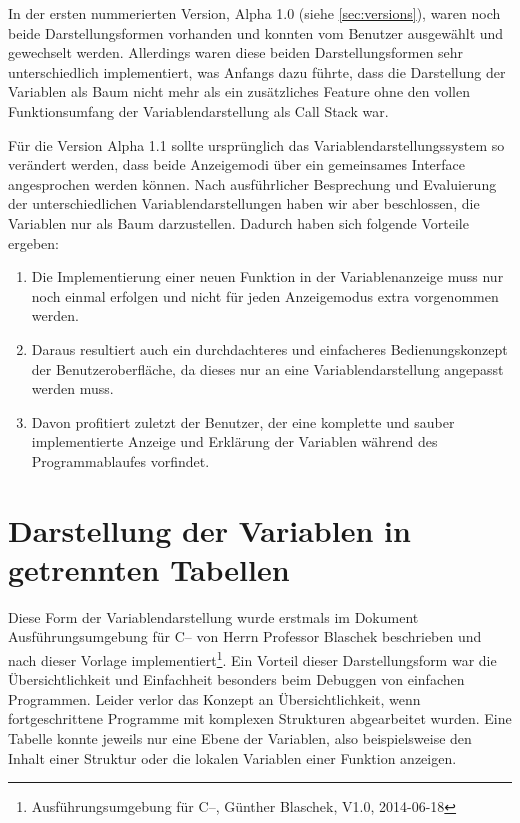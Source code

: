 In der ersten nummerierten Version, Alpha 1.0 (siehe \ref{sec:versions}), waren noch beide Darstellungsformen vorhanden und konnten vom Benutzer ausgewählt und gewechselt werden. Allerdings waren diese beiden Darstellungsformen sehr unterschiedlich implementiert, was Anfangs dazu führte, dass die Darstellung der Variablen als Baum nicht mehr als ein zusätzliches Feature ohne den vollen Funktionsumfang der Variablendarstellung als Call Stack war.

Für die Version Alpha 1.1 sollte ursprünglich das Variablendarstellungssystem so verändert werden, dass beide Anzeigemodi über ein gemeinsames Interface angesprochen werden können. Nach ausführlicher Besprechung und Evaluierung der unterschiedlichen Variablendarstellungen haben wir aber beschlossen, die Variablen nur als Baum darzustellen. Dadurch haben sich folgende Vorteile ergeben:
\begin{enumerate}
\item Die Implementierung einer neuen Funktion in der Variablenanzeige muss nur noch einmal erfolgen und nicht für jeden Anzeigemodus extra vorgenommen werden.
\item Daraus resultiert auch ein durchdachteres und einfacheres Bedienungskonzept der Benutzeroberfläche, da dieses nur an eine Variablendarstellung angepasst werden muss.
\item Davon profitiert zuletzt der Benutzer, der eine komplette und sauber implementierte Anzeige und Erklärung der Variablen während des Programmablaufes vorfindet.
\end{enumerate}

\section{Darstellung der Variablen in getrennten Tabellen}

Diese Form der Variablendarstellung wurde erstmals im Dokument Ausführungsumgebung für C-- von Herrn Professor Blaschek beschrieben und nach dieser Vorlage implementiert\footnote{Ausführungsumgebung für C--, Günther Blaschek, V1.0, 2014-06-18}. Ein Vorteil dieser Darstellungsform war die Übersichtlichkeit und Einfachheit besonders beim Debuggen von einfachen Programmen. Leider verlor das Konzept an Übersichtlichkeit, wenn fortgeschrittene Programme mit komplexen Strukturen abgearbeitet wurden. Eine Tabelle konnte jeweils nur eine Ebene der Variablen, also beispielsweise den Inhalt einer Struktur oder die lokalen Variablen einer Funktion anzeigen.

